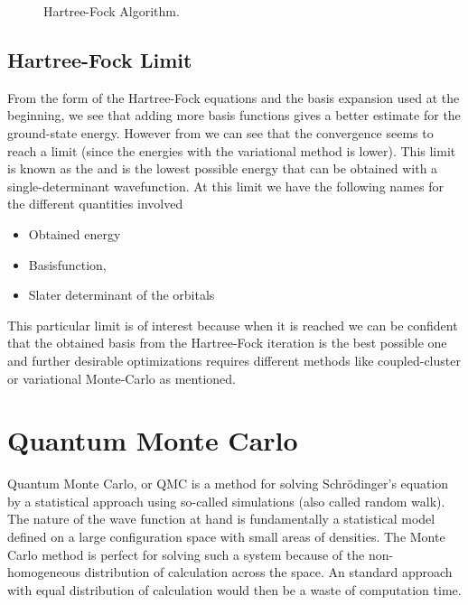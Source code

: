 \begin{figure}[H]
            \caption{Hartree-Fock Algorithm.}
        \end{figure}

\subsection{Hartree-Fock Limit\label{susec:HFL}}
    From the form of the Hartree-Fock equations and the basis expansion used at
    the beginning, we see that adding more basis functions gives a better
    estimate for the ground-state energy. However from  we can
    see that the convergence seems to reach a limit (since the energies with
    the variational method is lower). This limit is known as the
    \cite{HFlimit} and is the lowest possible energy
    that can be obtained with a single-determinant wavefunction. At this limit
    we have the following names for the different quantities involved
        \begin{itemize}
            \item{ Obtained energy}
            \item{ Basisfunction, }
            \item{ Slater determinant of the orbitals}
        \end{itemize}
    This particular limit is of interest because when it is reached we can be
    confident that the obtained basis from the Hartree-Fock iteration is the
    best possible one and further desirable optimizations requires different
    methods like coupled-cluster or variational Monte-Carlo as mentioned.


\section{Quantum Monte Carlo\label{sec:QMC}}
    Quantum Monte Carlo, or QMC is a method for solving Schrödinger's equation
    by a statistical approach using so-called  simulations
    (also called random walk). The nature of the wave function at hand is
    fundamentally a statistical model defined on a large configuration space
    with small areas of densities. The Monte Carlo method is perfect for
    solving such a system because of the non-homogeneous distribution of
    calculation across the space. An standard approach with equal distribution
    of calculation would then be a waste of computation time. 

